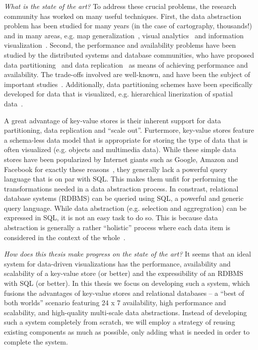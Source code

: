 \emph{What is the state of the art?} To address these crucial problems, the research community has worked on many useful techniques. First, the data abstraction problem has been studied for many years (in the case of cartography, thousands!) and in many areas, e.g. map generalization~\cite{weibel}, visual analytics~\cite{see:db} and information visualization~\cite{metro:stops}. Second, the performance and availability problems have been studied by the distributed systems and database communities, who have proposed data partitioning~\cite{foo} and data replication~\cite{foo} as means of achieving performance and availability. The trade-offs involved are well-known, and have been the subject of important studies~\cite{danger:of:replication, cap:theorem}. Additionally, data partitioning schemes have been specifically developed for data that is visualized, e.g. hierarchical linerization of spatial data~\cite{hilbert:curve, z:curve, xyz:protocol}. 

A great advantage of key-value stores is their inherent support for data partitioning, data replication and ``scale out''. Furtermore, key-value stores feature a schema-less data model that is appropriate for storing the type of data that is often visualized (e.g. objects and multimedia data). While these simple data stores have been popularized by Internet giants such as Google, Amazon and Facebook for exactly these reasons~\cite{dynamodb, bigtable, haystack}, they generally lack a powerful query language that is on par with SQL. This makes them unfit for performing the transformations needed in a data abstraction process. In constrast, relational database systems (RDBMS) can be queried using SQL, a powerful and generic query language. While data abstraction (e.g. selection and aggregration) can be expressed in SQL, it is not an easy task to do so. This is because data abstraction is generally a rather ``holistic'' process where each data item is considered in the context of the whole~\cite{conflicts:principles}.

\emph{How does this thesis make progress on the state of the art?} It seems that an ideal system for data-driven visualizations has the performance, availability and scalability of a key-value store (or better) and the expressibility of an RDBMS with SQL (or better). In this thesis we focus on developing such a system, which fusions the advantages of key-value stores and relational databases -- a ``best of both worlds'' scenario featuring 24 x 7 availability, high performance and scalability, and high-quality multi-scale data abstractions. Instead of developing such a system completely from scratch, we will employ a strategy of reusing existing components as much as possible, only adding what is needed in order to complete the system.

